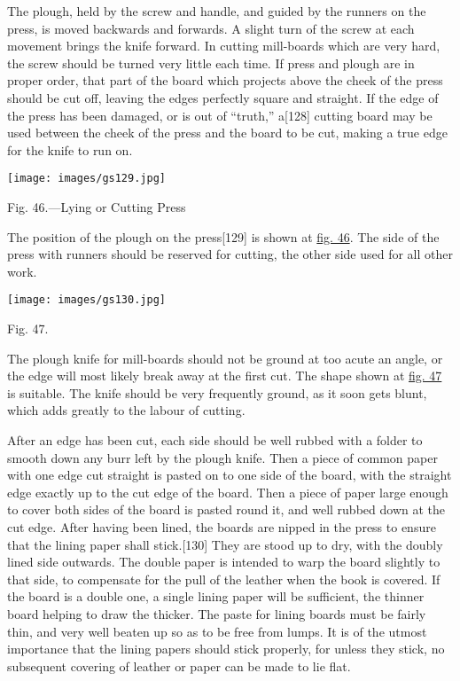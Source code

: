 \documentclass[
]{article}
\begin{document}
The plough, held by the screw and handle, and guided by the runners on
the press, is moved backwards and forwards. A slight turn of the screw
at each movement brings the knife forward. In cutting mill-boards which
are very hard, the screw should be turned very little each time. If
press and plough are in proper order, that part of the board which
projects above the cheek of the press should be cut off, leaving the
edges perfectly square and straight. If the edge of the press has been
damaged, or is out of ``truth,''
a{\protect\hypertarget{Page_128}{}{{[}128{]}}} cutting board may be used
between the cheek of the press and the board to be cut, making a true
edge for the knife to run on.

\protect\hypertarget{Fig_46}{}{}
\texttt{[image: images/gs129.jpg]}

Fig. 46.---Lying or Cutting Press

The position of the plough on the
press{\protect\hypertarget{Page_129}{}{{[}129{]}}} is shown at
\protect\hyperlink{Fig_46}{fig. 46}. The side of the press with runners
should be reserved for cutting, the other side used for all other work.

\protect\hypertarget{Fig_47}{}{}
\texttt{[image: images/gs130.jpg]}

Fig. 47.

The plough knife for mill-boards should not be ground at too acute an
angle, or the edge will most likely break away at the first cut. The
shape shown at \protect\hyperlink{Fig_47}{fig. 47} is suitable. The
knife should be very frequently ground, as it soon gets blunt, which
adds greatly to the labour of cutting.

After an edge has been cut, each side should be well rubbed with a
folder to smooth down any burr left by the plough knife. Then a piece of
common paper with one edge cut straight is pasted on to one side of the
board, with the straight edge exactly up to the cut edge of the board.
Then a piece of paper large enough to cover both sides of the board is
pasted round it, and well rubbed down at the cut edge. After having been
lined, the boards are nipped in the press to ensure that the lining
paper shall stick.{\protect\hypertarget{Page_130}{}{{[}130{]}}} They are
stood up to dry, with the doubly lined side outwards. The double paper
is intended to warp the board slightly to that side, to compensate for
the pull of the leather when the book is covered. If the board is a
double one, a single lining paper will be sufficient, the thinner board
helping to draw the thicker. The paste for lining boards must be fairly
thin, and very well beaten up so as to be free from lumps. It is of the
utmost importance that the lining papers should stick properly, for
unless they stick, no subsequent covering of leather or paper can be
made to lie flat.
\end{document}
